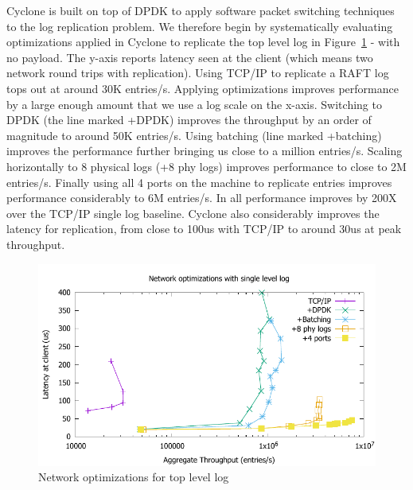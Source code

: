 \documentclass[10pt, preprint, nonatbib]{sigplanconf}
\begin{document}
Cyclone is built on top of DPDK to apply software packet switching techniques to
the log replication problem. We therefore begin by systematically evaluating
optimizations applied in Cyclone to replicate the top level log in
Figure~\ref{fig:network_opts} - with no payload. The y-axis reports latency seen
at the client (which means two network round trips with replication). Using
TCP/IP to replicate a RAFT log tops out at around 30K entries/s. Applying
optimizations improves performance by a large enough amount that we use a log
scale on the x-axis. Switching to DPDK (the line marked +DPDK) improves the
throughput by an order of magnitude to around 50K entries/s. Using batching
(line marked +batching) improves the performance further bringing us close to a
million entries/s. Scaling horizontally to 8 physical logs (+8 phy logs)
improves performance to close to 2M entries/s. Finally using all 4 ports on the
machine to replicate entries improves performance considerably to 6M
entries/s. In all performance improves by 200X over the TCP/IP single log
baseline. Cyclone also considerably improves the latency for replication, from
close to 100us with TCP/IP to around 30us at peak throughput.

\begin{figure}
\includegraphics[scale=0.6]{results2/network_opts.pdf}
\caption{Network optimizations for top level log}
\label{fig:network_opts}
\end{figure}
\end{document}
